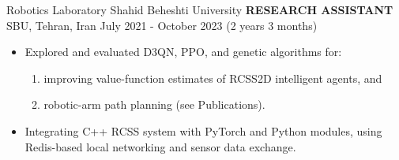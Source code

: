 
\begin{cventries}
    \cventry
    {Robotics Laboratory \textemdash Shahid Beheshti University}
    {\textbf{RESEARCH ASSISTANT}}
    {SBU, Tehran, Iran}
    {July 2021 - October 2023 (2 years 3 months)}
    {
        \begin{itemize}
            \item Explored and evaluated D3QN, PPO, and genetic algorithms for: 
            \begin{enumerate}[label=(\alph*)]    
                \item improving value-function estimates of RCSS2D intelligent agents, and
                \item robotic-arm path planning (see Publications).
            \end{enumerate}
            \item Integrating C++ RCSS system with PyTorch and Python modules, using Redis-based local networking and sensor data exchange.
        \end{itemize}
    }
    \vspace{0.4 cm}
\end{cventries}

